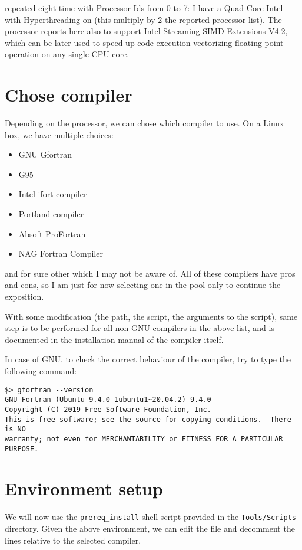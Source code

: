 repeated eight time with Processor Ids from 0 to 7: I have a Quad Core Intel
with Hyperthreading on (this multiply by 2 the reported processor list).
The processor reports here also to support Intel Streaming SIMD Extensions V4.2,
which can be later used to speed up code execution vectorizing floating point
operation on any single CPU core.

\section{Chose compiler}

Depending on the processor, we can chose which compiler to use. On a Linux box,
we have multiple choices:

\begin{itemize}
\item GNU Gfortran
\item G95
\item Intel ifort compiler
\item Portland compiler
\item Absoft ProFortran
\item NAG Fortran Compiler
\end{itemize}

and for sure other which I may not be aware of. All of these compilers have pros
and cons, so I am just for now selecting one in the pool only to continue the
exposition.

With some modification (the path, the script, the arguments to the script),
same step is to be performed for all non-GNU compilers in the above list, and
is documented in the installation manual of the compiler itself.

In case of GNU, to check the correct behaviour of the compiler, try to
type the following command:

\begin{Verbatim}
$> gfortran --version
GNU Fortran (Ubuntu 9.4.0-1ubuntu1~20.04.2) 9.4.0
Copyright (C) 2019 Free Software Foundation, Inc.
This is free software; see the source for copying conditions.  There is NO
warranty; not even for MERCHANTABILITY or FITNESS FOR A PARTICULAR PURPOSE.

\end{Verbatim}

\section{Environment setup}

We will now use the \verb=prereq_install= shell script provided in the
\verb=Tools/Scripts= directory. Given the above environment, we can edit
the file and decomment the lines relative to the selected compiler.

